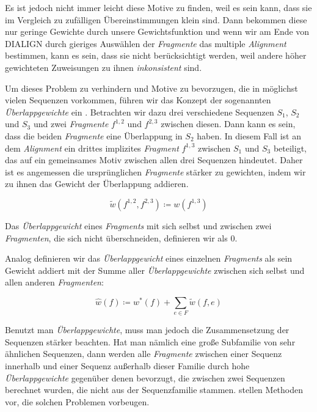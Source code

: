 Es ist jedoch nicht immer leicht diese Motive zu finden, weil es sein kann, dass sie im Vergleich zu zufälligen Übereinstimmungen klein sind. Dann bekommen diese nur geringe Gewichte durch unsere Gewichtsfunktion und wenn wir am Ende von DIALIGN	durch gieriges Auswählen der \emph{Fragmente} das multiple \emph{Alignment} bestimmen, kann es sein, dass sie nicht berücksichtigt werden, weil andere höher gewichteten Zuweisungen zu ihnen \emph{inkonsistent} sind. 

Um dieses Problem zu verhindern und Motive zu bevorzugen, die in möglichst vielen Sequenzen vorkommen, führen wir das Konzept der sogenannten \emph{Überlappgewichte} ein \citep{mdw96}. Betrachten wir dazu drei verschiedene Sequenzen $S_1$, $S_2$ und $S_3$ und zwei \emph{Fragmente} $f^{1,2}$ und $f^{2,3}$ zwischen diesen. Dann kann es sein, dass die beiden \emph{Fragmente} eine Überlappung in $S_2$ haben. In diesem Fall ist an dem \emph{Alignment} ein drittes implizites \emph{Fragment} $f^{1,3}$ zwischen $S_1$ und $S_3$ beteiligt, das auf ein gemeinsames Motiv zwischen allen drei Sequenzen hindeutet. Daher ist es angemessen die ursprünglichen \emph{Fragmente} stärker zu gewichten, indem wir zu ihnen das Gewicht der Überlappung addieren.

\begin{equation}
	\tilde{w}(f^{1,2},f^{2,3}) \coloneqq w(f^{1,3})
\end{equation}

Das \emph{Überlappgewicht} eines \emph{Fragments} mit sich selbst und zwischen zwei \emph{Fragmenten}, die sich nicht überschneiden, definieren wir als 0.

Analog definieren wir das \emph{Überlappgewicht} eines einzelnen \emph{Fragments} als sein Gewicht addiert mit der Summe aller \emph{Überlappgewichte} zwischen sich selbst und allen anderen \emph{Fragmenten}:

\begin{equation}
	\hat{w}(f)\coloneqq w^*(f)+\sum_{e \in F}\tilde{w}(f,e)
\end{equation} 

Benutzt man \emph{Überlappgewichte}, muss man jedoch die Zusammensetzung der Sequenzen stärker beachten. Hat man nämlich eine große Subfamilie von sehr ähnlichen Sequenzen, dann werden alle \emph{Fragmente} zwischen einer Sequenz innerhalb und einer Sequenz außerhalb dieser Familie durch hohe \emph{Überlappgewichte} gegenüber denen bevorzugt, die zwischen zwei Sequenzen berechnet wurden, die nicht aus der Sequenzfamilie stammen. \cite{vs93} stellen Methoden vor, die solchen Problemen vorbeugen. 
  
